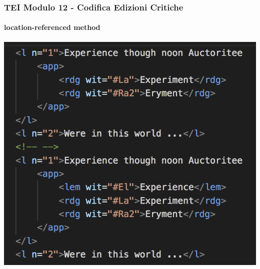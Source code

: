 \begin{frame}
    \frametitle{TEI Modulo 12 - Codifica Edizioni Critiche}
    \framesubtitle{location-referenced method}
    \addtocounter{nframe}{1}
    










    \begin{center}
       \includegraphics[width=.95\textwidth]{imgs/location-referenced-inline.png}
    \end{center}

\end{frame}

